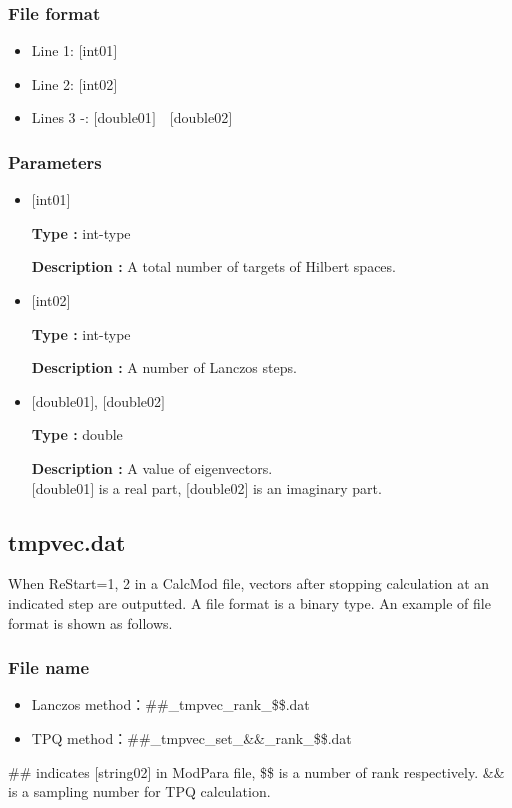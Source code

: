 \subsubsection{File format}
 \begin{itemize}
   \item  Line 1: $[$int01$]$
   \item  Line 2: $[$int02$]$
   \item  Lines 3 -: $[$double01$]$~~$[$double02$]$
  \end{itemize}
  
\subsubsection{Parameters}
 \begin{itemize}

  \item  $[$int01$]$

 {\bf Type :} int-type

{\bf Description :}  A total number of targets of Hilbert spaces.

  \item  $[$int02$]$

 {\bf Type :} int-type

{\bf Description :}  { A number of Lanczos steps.}

 \item  $[$double01$]$, $[$double02$]$

 {\bf Type :} double 

{\bf Description :} A value of eigenvectors.\\
$[$double01$]$ is a real part, $[$double02$]$ is an imaginary part.\\

 \end{itemize}

\newpage
\subsection{{tmpvec.dat}}
\label{Subsec:restart}
When ReStart=1, 2 in a CalcMod file, vectors after stopping calculation at an indicated step are outputted. A file format is a binary type. 
An example of file format is shown as follows.

\subsubsection{File name}
\begin{itemize}
   \item{Lanczos method：\#\#\_tmpvec\_rank\_\$\$.dat}
   \item{TPQ method：\#\#\_tmpvec\_set\_\&\&\_rank\_\$\$.dat}   
\end{itemize}
  \#\# indicates [string02] in ModPara file, \$\$ is a number of rank respectively. \&\& is a sampling number for TPQ calculation. 

